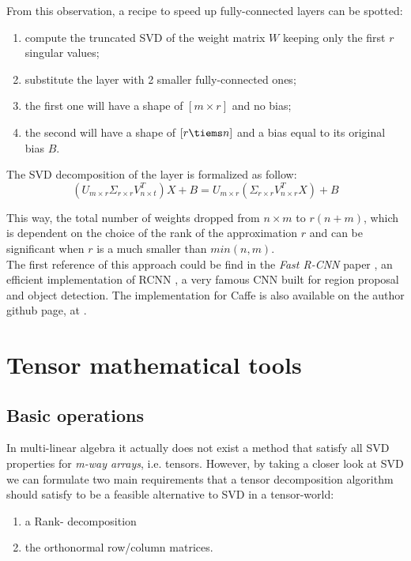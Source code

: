 From this observation, a recipe to speed up fully-connected layers can be spotted: 
\begin{enumerate}
	\item compute the truncated SVD of the weight matrix $W$ keeping only the first $\mathit{r}$ singular values; 
	\item substitute the layer with 2 smaller fully-connected ones; 
	\item the first one will have a shape of $[m \times r]$ and no bias; 
	\item the second will have a shape of $[ r \tiems n]$ and a bias equal to its original bias $B$.   
\end{enumerate}

The SVD decomposition of the layer is formalized as follow: 
\begin{equation}
(U_{m \times r} \Sigma_{r \times r} V^T_{n \times t}) X+ B = U_{m \times r} ( \Sigma_{r \times r}V^T_{n \times r} X) + B 
\end{equation}


This way, the total number of weights dropped from $n \times m$ to $r(n+m)$, which is dependent on the choice of the rank of the approximation $r$ and can be significant when $r$ is a much smaller than $min(n, m)$.\\
The first reference of this approach could be find in the \emph{Fast R-CNN} paper , an efficient implementation of RCNN \parencite{rcnn}, a very famous CNN built for region proposal and object detection. The implementation for Caffe is also available on the author github page, at \parencite{Wgithub-rcnn}.
\section{Tensor mathematical tools}
\label{sec:tensor-math}

\subsection{Basic operations}
In multi-linear algebra it actually does not exist a method that satisfy all SVD properties for \emph{m-way arrays}, i.e. tensors. However, by taking a closer look at SVD we can formulate two main requirements that a tensor decomposition algorithm should satisfy to be a feasible alternative to SVD in a tensor-world: 
{\begin{enumerate}
	\item a Rank- decomposition
	\item the orthonormal row/column matrices.
\end{enumerate}}

